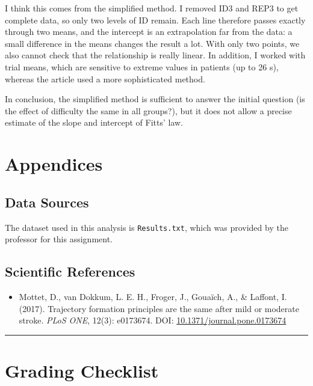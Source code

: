 \documentclass[
  letterpaper,
  DIV=11,
  numbers=noendperiod]{scrartcl}
\providecommand{\tightlist}{%
  \setlength{\itemsep}{0pt}\setlength{\parskip}{0pt}}
\begin{document}
I think this comes from the simplified method. I removed ID3 and REP3 to
get complete data, so only two levels of ID remain. Each line therefore
passes exactly through two means, and the intercept is an extrapolation
far from the data: a small difference in the means changes the result a
lot. With only two points, we also cannot check that the relationship is
really linear. In addition, I worked with trial means, which are
sensitive to extreme values in patients (up to 26 s), whereas the
article used a more sophisticated method.

In conclusion, the simplified method is sufficient to answer the initial
question (is the effect of difficulty the same in all groups?), but it
does not allow a precise estimate of the slope and intercept of Fitts'
law.

\section{Appendices}\label{appendices}

\subsection{Data Sources}\label{data-sources}

The dataset used in this analysis is \texttt{Results.txt}, which was
provided by the professor for this assignment.

\subsection{Scientific References}\label{scientific-references}

\begin{itemize}
\tightlist
\item
  Mottet, D., van Dokkum, L. E. H., Froger, J., Gouaïch, A., \& Laffont,
  I. (2017). Trajectory formation principles are the same after mild or
  moderate stroke. \emph{PLoS ONE}, 12(3): e0173674. DOI:
  \href{https://journals.plos.org/plosone/article?id=10.1371/journal.pone.0173674}{10.1371/journal.pone.0173674}
\end{itemize}

\begin{center}\rule{0.5\linewidth}{0.5pt}\end{center}

\section{Grading Checklist}\label{grading-checklist}
\end{document}
